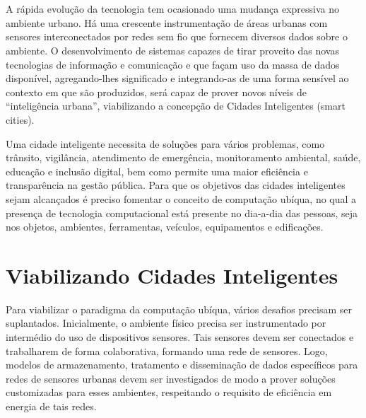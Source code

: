 \documentclass{acm_proc_article-sp}
\newcommand{\fig}[4][htb]{
  \begin{figure}[#1]
    {\centering{\texttt{[image: fig/\#2]}}\par}
    \label{fig:#2}
  \end{figure}
}
\begin{document}
\maketitle

\section*{}
A rápida evolução da tecnologia tem ocasionado uma mudança expressiva no
ambiente urbano. Há uma crescente instrumentação de áreas urbanas com sensores
interconectados por redes sem fio que fornecem diversos dados sobre o
ambiente. O desenvolvimento de sistemas capazes de tirar proveito das novas
tecnologias de informação e comunicação e que façam uso da massa de dados
disponível, agregando-lhes significado e integrando-as de uma forma sensível
ao contexto em que são produzidos, será capaz de prover novos níveis de
``inteligência urbana'', viabilizando a concepção de Cidades Inteligentes
(smart cities).

\fig{smartgrid2}{}{width=\columnwidth}

Uma cidade inteligente necessita de soluções para vários problemas, como
trânsito, vigilância, atendimento de emergência, monitoramento ambiental,
saúde, educação e inclusão digital, bem como permite uma maior eficiência e
transparência na gestão pública. Para que os objetivos das cidades
inteligentes sejam alcançados é preciso fomentar o conceito de computação
ubíqua, no qual a presença de tecnologia computacional está presente no
dia-a-dia das pessoas, seja nos objetos, ambientes, ferramentas, veículos,
equipamentos e edificações.

\section*{Viabilizando Cidades Inteligentes}

Para viabilizar o paradigma da computação ubíqua, vários desafios precisam ser suplantados. Inicialmente, o ambiente físico precisa ser instrumentado por intermédio do uso de dispositivos sensores. Tais sensores devem ser conectados e trabalharem de forma colaborativa, formando uma rede de sensores. Logo, modelos de armazenamento, tratamento e disseminação de dados específicos para redes de sensores urbanas devem ser investigados de modo a prover soluções customizadas para esses ambientes, respeitando o requisito de eficiência em energia de tais redes.

\fig{cia2-overview}{}{width=\columnwidth}
\end{document}
